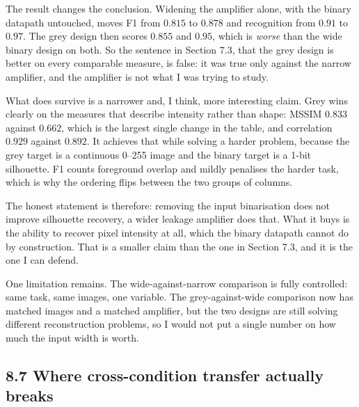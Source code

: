 \documentclass[11pt,a4paper]{article}
\begin{document}
\begin{table}[h]
  \centering
  \small
  \resizebox{\textwidth}{!}{}
  \caption{The amplifier control. All three rows use the same 2000 images and the same
  generator; the first two rows also use the same task, and differ only in amplifier
  width.}
  \label{tab:amp}
\end{table}

The result changes the conclusion. Widening the amplifier alone, with the binary datapath
untouched, moves F1 from $0.815$ to $0.878$ and recognition from $0.91$ to $0.97$. The
grey design then scores $0.855$ and $0.95$, which is \emph{worse} than the wide binary
design on both. So the sentence in Section 7.3, that the grey design is better on every
comparable measure, is false: it was true only against the narrow amplifier, and the
amplifier is not what I was trying to study.

What does survive is a narrower and, I think, more interesting claim. Grey wins clearly on
the measures that describe intensity rather than shape: MSSIM $0.833$ against $0.662$,
which is the largest single change in the table, and correlation $0.929$ against $0.892$.
It achieves that while solving a harder problem, because the grey target is a continuous
0--255 image and the binary target is a 1-bit silhouette. F1 counts foreground overlap and
mildly penalises the harder task, which is why the ordering flips between the two groups
of columns.

The honest statement is therefore: removing the input binarisation does not improve
silhouette recovery, a wider leakage amplifier does that. What it buys is the ability to
recover pixel intensity at all, which the binary datapath cannot do by construction. That
is a smaller claim than the one in Section 7.3, and it is the one I can defend.

One limitation remains. The wide-against-narrow comparison is fully controlled: same task,
same images, one variable. The grey-against-wide comparison now has matched images and a
matched amplifier, but the two designs are still solving different reconstruction problems,
so I would not put a single number on how much the input width is worth.


\subsection*{8.7 Where cross-condition transfer actually breaks}
\end{document}
